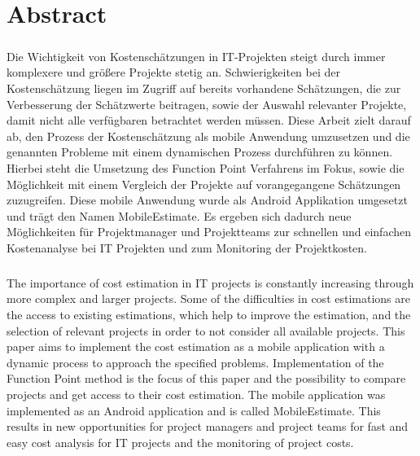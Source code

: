 

\chapter*{Abstract}

\paragraph*{}
Die Wichtigkeit von Kostenschätzungen in IT-Projekten steigt durch immer komplexere und größere Projekte stetig an. Schwierigkeiten bei der Kostenschätzung liegen im Zugriff auf bereits vorhandene Schätzungen, die zur Verbesserung der Schätzwerte beitragen, sowie der Auswahl relevanter Projekte, damit nicht alle verfügbaren betrachtet werden müssen. Diese Arbeit zielt darauf ab, den Prozess der Kostenschätzung als mobile Anwendung umzusetzen und die genannten Probleme mit einem dynamischen Prozess durchführen zu können. Hierbei steht die Umsetzung des Function Point Verfahrens im Fokus, sowie die Möglichkeit mit einem Vergleich der Projekte auf vorangegangene Schätzungen zuzugreifen. Diese mobile Anwendung wurde als Android Applikation umgesetzt und trägt den Namen MobileEstimate. Es ergeben sich dadurch neue Möglichkeiten für Projektmanager und Projektteams zur schnellen und einfachen Kostenanalyse bei IT Projekten und zum Monitoring der Projektkosten.

\paragraph*{}
The importance of cost estimation in IT projects is constantly increasing through more complex and larger projects. Some of the difficulties in cost estimations are the access to existing estimations, which help to improve the estimation, and the selection of relevant projects in order to not consider all available projects. This paper aims to implement the cost estimation as a mobile application with a dynamic process to approach the specified problems. Implementation of the Function Point method is the focus of this paper and the possibility to compare projects and get access to their cost estimation. The mobile application was implemented as an Android application and is called MobileEstimate. This results in new opportunities for project managers and project teams for fast and easy cost analysis for IT projects and the monitoring of project costs.

